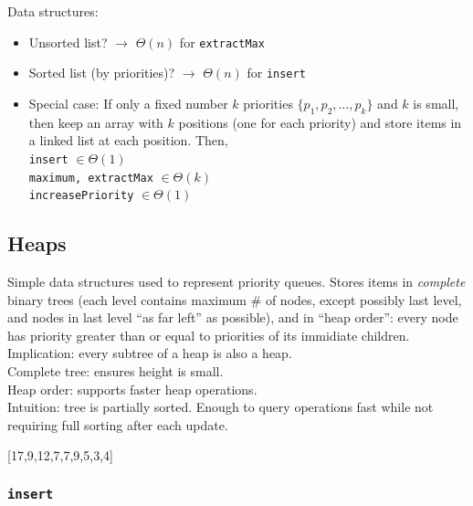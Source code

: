 \noindent Data structures:
\begin{itemize}
	\item Unsorted list? $\rightarrow$ $\Theta(n)$ for \texttt{extractMax}
	\item Sorted list (by priorities)? $\rightarrow$ $\Theta(n)$ for \texttt{insert}
	\item Special case: If only a fixed number $k$ priorities $\{p_1,p_2,\ldots,p_k\}$ and $k$ is small,
		then keep an array with $k$ positions (one for each priority) and store items in a linked list at each 
		position. Then, \\
		\texttt{insert} $\in \Theta(1)$ \\
		\texttt{maximum, extractMax} $\in \Theta(k)$ \\
		\texttt{increasePriority} $\in \Theta(1)$
\end{itemize}

\subsection*{Heaps}

\noindent Simple data structures used to represent priority queues. Stores items in \textit{complete} binary trees (each level contains maximum \# of nodes, except possibly last level, and nodes in last level ``as far left'' as possible), and in ``heap order'': every node has priority greater than or equal to priorities of its immidiate children. Implication: every subtree of a heap is also a heap. \\
Complete tree: ensures height is small. \\
Heap order: supports faster heap operations. \\
Intuition: tree is partially sorted. Enough to query operations fast while not requiring full sorting after each update.

\begin{center}

[17,9,12,7,7,9,5,3,4]
\end{center}

\subsubsection*{\texttt{insert}}

